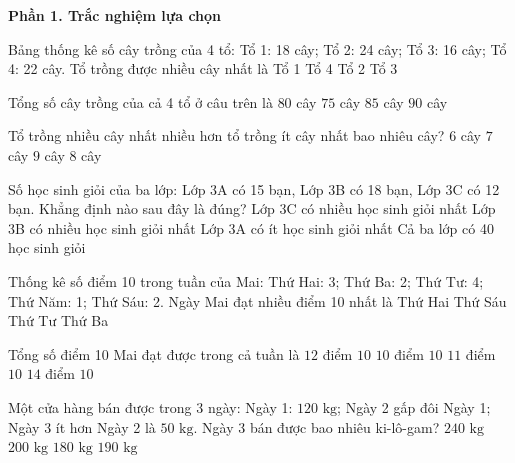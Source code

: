 \textbf{Phần 1. Trắc nghiệm lựa chọn}

\begin{ex} %
Bảng thống kê số cây trồng của 4 tổ: Tổ 1: 18 cây; Tổ 2: 24 cây; Tổ 3: 16 cây; Tổ 4: 22 cây. Tổ trồng được nhiều cây nhất là
\choice
{Tổ 1}
{Tổ 4}
{\True Tổ 2}
{Tổ 3}
\end{ex}

\begin{ex} %
Tổng số cây trồng của cả 4 tổ ở câu trên là
\choice
{\True $80$ cây}
{$75$ cây}
{$85$ cây}
{$90$ cây}
\end{ex}

\begin{ex} %
Tổ trồng nhiều cây nhất nhiều hơn tổ trồng ít cây nhất bao nhiêu cây?
\choice
{$6$ cây}
{$7$ cây}
{$9$ cây}
{\True $8$ cây}
\end{ex}

\begin{ex} %
Số học sinh giỏi của ba lớp: Lớp 3A có 15 bạn, Lớp 3B có 18 bạn, Lớp 3C có 12 bạn. Khẳng định nào sau đây là đúng?
\choice
{Lớp 3C có nhiều học sinh giỏi nhất}
{\True Lớp 3B có nhiều học sinh giỏi nhất}
{Lớp 3A có ít học sinh giỏi nhất}
{Cả ba lớp có 40 học sinh giỏi}
\end{ex}

\begin{ex} %
Thống kê số điểm 10 trong tuần của Mai: Thứ Hai: 3; Thứ Ba: 2; Thứ Tư: 4; Thứ Năm: 1; Thứ Sáu: 2. Ngày Mai đạt nhiều điểm 10 nhất là
\choice
{Thứ Hai}
{Thứ Sáu}
{\True Thứ Tư}
{Thứ Ba}
\end{ex}

\begin{ex} %
Tổng số điểm 10 Mai đạt được trong cả tuần là
\choice
{\True $12$ điểm $10$}
{$10$ điểm $10$}
{$11$ điểm $10$}
{$14$ điểm $10$}
\end{ex}

\begin{ex} %
Một cửa hàng bán được trong 3 ngày: Ngày 1: $120\text{ kg}$; Ngày 2 gấp đôi Ngày 1; Ngày 3 ít hơn Ngày 2 là $50\text{ kg}$. Ngày 3 bán được bao nhiêu ki-lô-gam?
\choice
{$240\text{ kg}$}
{$200\text{ kg}$}
{$180\text{ kg}$}
{\True $190\text{ kg}$}
\end{ex}


